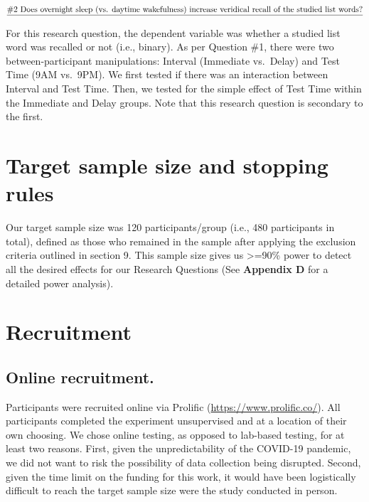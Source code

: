 \documentclass[
]{article}
\begin{document}
\(\text{\underline{\#2 Does overnight sleep (vs. daytime wakefulness) increase veridical recall of the studied list words?}}\)

For this research question, the dependent variable was whether a studied list word was recalled or not (i.e., binary). As per Question \#1, there were two between-participant manipulations: Interval (Immediate vs.~Delay) and Test Time (9AM vs.~9PM). We first tested if there was an interaction between Interval and Test Time. Then, we tested for the simple effect of Test Time within the Immediate and Delay groups. Note that this research question is secondary to the first.

\hypertarget{target-sample-size-and-stopping-rules}{%
\section{Target sample size and stopping rules}\label{target-sample-size-and-stopping-rules}}

Our target sample size was 120 participants/group (i.e., 480 participants in total), defined as those who remained in the sample after applying the exclusion criteria outlined in section 9. This sample size gives us \textgreater=90\% power to detect all the desired effects for our Research Questions (See \textbf{Appendix D} for a detailed power analysis).

\hypertarget{recruitment}{%
\section{Recruitment}\label{recruitment}}

\hypertarget{online-recruitment.}{%
\subsection{Online recruitment.}\label{online-recruitment.}}

Participants were recruited online via Prolific (\url{https://www.prolific.co/}). All participants completed the experiment unsupervised and at a location of their own choosing. We chose online testing, as opposed to lab-based testing, for at least two reasons. First, given the unpredictability of the COVID-19 pandemic, we did not want to risk the possibility of data collection being disrupted. Second, given the time limit on the funding for this work, it would have been logistically difficult to reach the target sample size were the study conducted in person.
\end{document}
